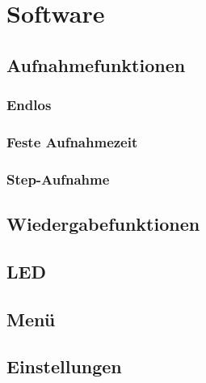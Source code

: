 \newpage
\section{Software}







\subsection{Aufnahmefunktionen}
\subsubsection{Endlos}
\subsubsection{Feste Aufnahmezeit}
\subsubsection{Step-Aufnahme}
\subsection{Wiedergabefunktionen}
\subsection{LED}


\subsection{Menü}
\subsection{Einstellungen}